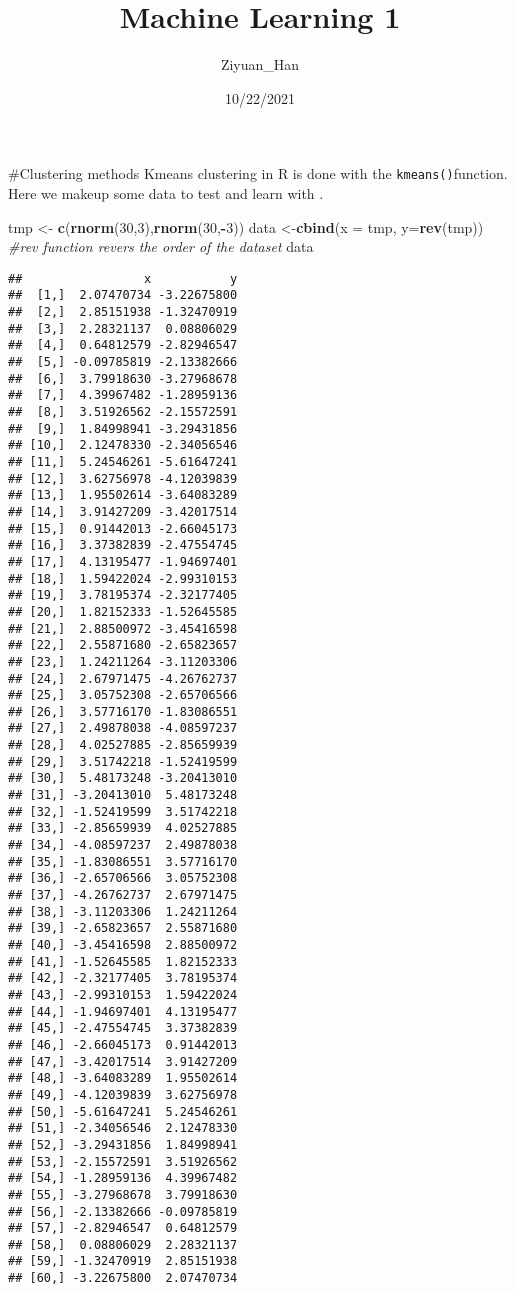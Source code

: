\documentclass[
]{article}
\title{Machine Learning 1}
\author{Ziyuan\_Han}
\date{10/22/2021}
\newenvironment{Shaded}{\begin{snugshade}}{\end{snugshade}}
\newcommand{\CommentTok}[1]{\textcolor[rgb]{0.56,0.35,0.01}{\textit{#1}}}
\newcommand{\DataTypeTok}[1]{\textcolor[rgb]{0.13,0.29,0.53}{#1}}
\newcommand{\DecValTok}[1]{\textcolor[rgb]{0.00,0.00,0.81}{#1}}
\newcommand{\KeywordTok}[1]{\textcolor[rgb]{0.13,0.29,0.53}{\textbf{#1}}}
\newcommand{\NormalTok}[1]{#1}
\newcommand{\OperatorTok}[1]{\textcolor[rgb]{0.81,0.36,0.00}{\textbf{#1}}}
\newcommand{\StringTok}[1]{\textcolor[rgb]{0.31,0.60,0.02}{#1}}
\begin{document}
\maketitle

\#Clustering methods Kmeans clustering in R is done with the
\texttt{kmeans()}function. Here we makeup some data to test and learn
with .

\begin{Shaded}
\begin{Highlighting}[]
\NormalTok{tmp <-}\StringTok{ }\KeywordTok{c}\NormalTok{(}\KeywordTok{rnorm}\NormalTok{(}\DecValTok{30}\NormalTok{,}\DecValTok{3}\NormalTok{),}\KeywordTok{rnorm}\NormalTok{(}\DecValTok{30}\NormalTok{,}\OperatorTok{-}\DecValTok{3}\NormalTok{))}
\NormalTok{data <-}\KeywordTok{cbind}\NormalTok{(}\DataTypeTok{x =}\NormalTok{ tmp, }\DataTypeTok{y=}\KeywordTok{rev}\NormalTok{(tmp)) }\CommentTok{#rev function revers the order of the dataset }
\NormalTok{data}
\end{Highlighting}
\end{Shaded}

\begin{verbatim}
##                 x           y
##  [1,]  2.07470734 -3.22675800
##  [2,]  2.85151938 -1.32470919
##  [3,]  2.28321137  0.08806029
##  [4,]  0.64812579 -2.82946547
##  [5,] -0.09785819 -2.13382666
##  [6,]  3.79918630 -3.27968678
##  [7,]  4.39967482 -1.28959136
##  [8,]  3.51926562 -2.15572591
##  [9,]  1.84998941 -3.29431856
## [10,]  2.12478330 -2.34056546
## [11,]  5.24546261 -5.61647241
## [12,]  3.62756978 -4.12039839
## [13,]  1.95502614 -3.64083289
## [14,]  3.91427209 -3.42017514
## [15,]  0.91442013 -2.66045173
## [16,]  3.37382839 -2.47554745
## [17,]  4.13195477 -1.94697401
## [18,]  1.59422024 -2.99310153
## [19,]  3.78195374 -2.32177405
## [20,]  1.82152333 -1.52645585
## [21,]  2.88500972 -3.45416598
## [22,]  2.55871680 -2.65823657
## [23,]  1.24211264 -3.11203306
## [24,]  2.67971475 -4.26762737
## [25,]  3.05752308 -2.65706566
## [26,]  3.57716170 -1.83086551
## [27,]  2.49878038 -4.08597237
## [28,]  4.02527885 -2.85659939
## [29,]  3.51742218 -1.52419599
## [30,]  5.48173248 -3.20413010
## [31,] -3.20413010  5.48173248
## [32,] -1.52419599  3.51742218
## [33,] -2.85659939  4.02527885
## [34,] -4.08597237  2.49878038
## [35,] -1.83086551  3.57716170
## [36,] -2.65706566  3.05752308
## [37,] -4.26762737  2.67971475
## [38,] -3.11203306  1.24211264
## [39,] -2.65823657  2.55871680
## [40,] -3.45416598  2.88500972
## [41,] -1.52645585  1.82152333
## [42,] -2.32177405  3.78195374
## [43,] -2.99310153  1.59422024
## [44,] -1.94697401  4.13195477
## [45,] -2.47554745  3.37382839
## [46,] -2.66045173  0.91442013
## [47,] -3.42017514  3.91427209
## [48,] -3.64083289  1.95502614
## [49,] -4.12039839  3.62756978
## [50,] -5.61647241  5.24546261
## [51,] -2.34056546  2.12478330
## [52,] -3.29431856  1.84998941
## [53,] -2.15572591  3.51926562
## [54,] -1.28959136  4.39967482
## [55,] -3.27968678  3.79918630
## [56,] -2.13382666 -0.09785819
## [57,] -2.82946547  0.64812579
## [58,]  0.08806029  2.28321137
## [59,] -1.32470919  2.85151938
## [60,] -3.22675800  2.07470734
\end{verbatim}
\end{document}
